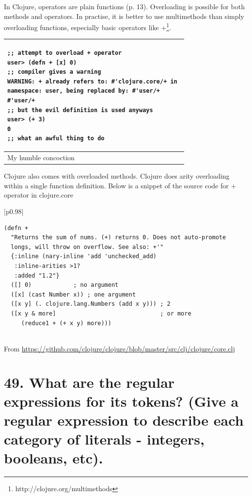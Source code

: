 \documentclass[12pt]{article}
\begin{document}
In Clojure, operators are plain functions \cite{fogus2014joy} (p. 13). Overloading is possible for both methods and operators. In practise, it is better to use multimethods than simply overloading functions, especially basic operators like +\footnote{http://clojure.org/multimethods}.

\begin{tabular}{|p{}|}
\hline
\begin{verbatim}
;; attempt to overload + operator
user> (defn + [x] 0)
;; compiler gives a warning
WARNING: + already refers to: #'clojure.core/+ in 
namespace: user, being replaced by: #'user/+
#'user/+
;; but the evil definition is used anyways
user> (+ 3)
0
;; what an awful thing to do
\end{verbatim}
\\
\hline
My humble concoction 
\\
\hline
\end{tabular}

Clojure also comes with overloaded methods. Clojure does arity overloading within a single function definition. Below is a snippet of the source code for + operator in clojure.core


\begin{tabular}{|p{}|}
\hline
\begin{verbatim}
(defn +
  "Returns the sum of nums. (+) returns 0. Does not auto-promote
  longs, will throw on overflow. See also: +'"
  {:inline (nary-inline 'add 'unchecked_add)
   :inline-arities >1?
   :added "1.2"}
  ([] 0)            ; no argument
  ([x] (cast Number x)) ; one argument
  ([x y] (. clojure.lang.Numbers (add x y))) ; 2
  ([x y & more]                              ; or more
     (reduce1 + (+ x y) more)))
\end{verbatim}
\\
\hline
From \url{https://github.com/clojure/clojure/blob/master/src/clj/clojure/core.clj}
\\
\hline
\end{tabular}



\part{49. What are the regular expressions for its tokens? (Give a regular expression to describe each category of literals - integers, booleans, etc).}
\end{document}
